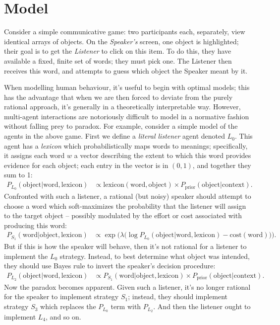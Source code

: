 \documentclass{article} %
\newcommand{\word}{\text{word}}
\newcommand{\obj}{\text{object}}
\newcommand{\lex}{\text{lexicon}}
\newcommand{\prior}{P_{\text{prior}}(\obj | \text{context})}
\begin{document}
\section{Model}

Consider a simple communicative game: two participants each,
separately, view identical arrays of objects. On the
\textit{Speaker's} screen, one object is highlighted; their goal is to
get the \textit{Listener} to click on this item. To do this, they have
available a fixed, finite set of words; they must pick one. The
Listener then receives this word, and attempts to guess which object
the Speaker meant by it.

When modelling human behaviour, it's useful to begin with optimal models; this has the advantage that when we are then forced to deviate from the purely rational approach, it's generally in a theoretically interpretable way. However, multi-agent interactions are notoriously difficult to model in a normative fashion without falling prey to paradox. For example, consider a simple model of the agents in the above game. First we define a \textit{literal listener} agent denoted $L_0$. This agent has a \textit{lexicon} which probabilistically maps words to meanings; specifically, it assigns each word $w$ a vector describing the extent to which this word provides evidence for each object; each entry in the vector is in $(0, 1)$, and together they sum to 1:
\begin{align*}
P_{L_0}(\obj | \word, \lex) &\propto \lex(\word, \obj) \times \prior.
\end{align*}
Confronted with such a listener, a rational (but noisy) speaker should attempt to choose a word which soft-maximizes the probability that the listener will assign to the target object -- possibly modulated by the effort or cost associated with producing this word:
\begin{align*}
P_{S_1}(\word | \obj, \lex) &\propto \exp\Big(\lambda \big(\log P_{L_0}(\obj | \word, \lex) - \text{cost}(\word)\big)\Big).
\end{align*}
But if this is how the speaker will behave, then it's not rational for a listener to implement the $L_0$ strategy. Instead, to best determine what object was intended, they should use Bayes rule to invert the speaker's decision procedure:
\begin{align*}
P_{L_2}(\obj | \word, \lex) &\propto P_{S_1}(\word | \obj, \lex) \times \prior.
\end{align*}
Now the paradox becomes apparent. Given such a listener, it's no longer rational for the speaker to implement strategy $S_1$; instead, they should implement strategy $S_3$ which replaces the $P_{L_0}$ term with $P_{L_2}$. And then the listener ought to implement $L_4$, and so on.
\end{document}
